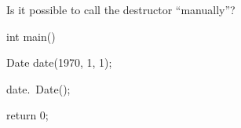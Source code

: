 Is it possible to call the destructor ``manually''?



\begin{consolethree}[escapeinside=||]

int main()

{

    Date date(1970, 1, 1);

    date.~Date();

    return 0;

}

\end{consolethree}

